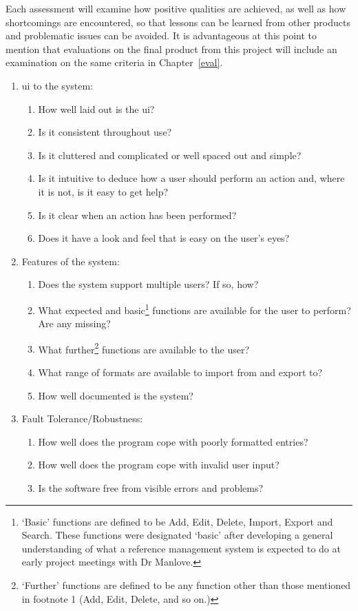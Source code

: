 Each assessment will examine how positive qualities are achieved, as well as how shortcomings are encountered, so that lessons can be learned from other products and problematic issues can be avoided.  It is advantageous at this point to mention that evaluations on the final product from this project will include an examination on the same criteria in Chapter~\ref{eval}.
\begin{enumerate}
	\item \gls{ui} to the system:
	\begin{enumerate}
		\item How well laid out is the \gls{ui}? 
		\item Is it consistent throughout use?
		\item Is it cluttered and complicated or well spaced out and simple?
		\item Is it intuitive to deduce how a user should perform an action and, where it is not, is it easy to get help?
		\item Is it clear when an action has been performed?
		\item Does it have a look and feel that is easy on the user's eyes?
	\end{enumerate}
	\item Features of the system:
	\begin{enumerate}
		\item Does the system support multiple users? If so, how?
		\item What expected and basic\footnote{`Basic' functions are defined to be Add, Edit, Delete, Import, Export and Search. These functions were designated `basic' after developing a general understanding of what a reference management system is expected to do at early project meetings with Dr Manlove.} functions are available for the user to perform? Are any missing?  %
		\item What further\footnote{`Further' functions are defined to be any function other than those mentioned in footnote 1 (Add, Edit, Delete, and so on.)} functions are available to the user? 
		\item What range of formats are available to import from and export to?
		\item How well documented is the system?
	\end{enumerate}
	\item Fault Tolerance/Robustness:
	\begin{enumerate}
		\item How well does the program cope with poorly formatted entries?
		\item How well does the program cope with invalid user input?
		\item Is the software free from visible errors and problems?
	\end{enumerate}
\end{enumerate}

